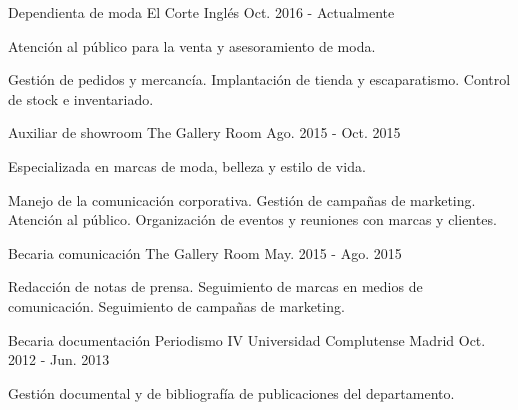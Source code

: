 

\begin{cventries}

  \cventry
    {Dependienta de moda} %
    {El Corte Inglés} %
    {} %
    {Oct. 2016 - Actualmente} %
    {
      \begin{cvitems} %
        \item {Atención al público para la venta y asesoramiento de moda.}
        \item {Gestión de pedidos y mercancía. Implantación de tienda y escaparatismo. Control de stock e inventariado.}
      \end{cvitems}
    }

  \cventry
    {Auxiliar de showroom} %
    {The Gallery Room} %
    {} %
    {Ago. 2015 - Oct. 2015} %
    {
      \begin{cvitems} %
        \item {Especializada en marcas de moda, belleza y estilo de vida.}
        \item {Manejo de la comunicación corporativa. Gestión de campañas de marketing. Atención al público. Organización de eventos y reuniones con marcas y clientes.}
      \end{cvitems}
    }

  \cventry
    {Becaria comunicación} %
    {The Gallery Room} %
    {} %
    {May. 2015 - Ago. 2015} %
    {
      \begin{cvitems} %
        \item {Redacción de notas de prensa. Seguimiento de marcas en medios de comunicación. Seguimiento de campañas de marketing.}
      \end{cvitems}
    }

  \cventry
    {Becaria documentación Periodismo IV} %
    {Universidad Complutense Madrid} %
    {} %
    {Oct. 2012 - Jun. 2013} %
    {
      \begin{cvitems} %
        \item {Gestión documental y de bibliografía de publicaciones del departamento.}
      \end{cvitems}
    }


\end{cventries}
